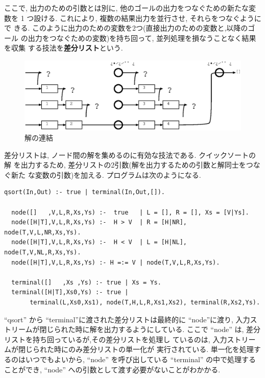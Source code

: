 \documentclass[a4,titlepage]{jsreport}
\let\dg\bf
\begin{document}
ここで, 出力のための引数とは別に,  他のゴールの出力をつなぐための新たな変数を
1 つ設ける.  これにより,  複数の結果出力を並行させ,  それらをつなぐようにで
きる.  このように出力のための変数を2つ(直接出力のための変数と,以降のゴール
の出力をつなぐための変数)を持ち回って,  並列処理を損なうことなく結果を収集
する技法を{\dg 差分リスト}という.  

\begin{figure}[htbp]
  \begin{center}
    \includegraphics[width=.8\textwidth]{fig/dlt6.eps}
    \caption{解の連結}
  \end{center}
\end{figure}

  差分リストは,  ノード間の解を集めるのに有効な技法である.  クイックソートの解
を出力するため,  差分リストの2引数(解を出力するための引数と解同士をつなぐ新た
な変数の引数)を加える.  プログラムは次のようになる.  

\begin{Verbatim}[baselinestretch=0.8]
  qsort(In,Out) :- true | terminal(In,Out,[]).

  node([]   ,V,L,R,Xs,Ys) :-  true   | L = [], R = [], Xs = [V|Ys].
  node([H|T],V,L,R,Xs,Ys) :-  H > V  | R = [H|NR], node(T,V,L,NR,Xs,Ys).
  node([H|T],V,L,R,Xs,Ys) :-  H < V  | L = [H|NL], node(T,V,NL,R,Xs,Ys).
  node([H|T],V,L,R,Xs,Ys) :- H =:= V | node(T,V,L,R,Xs,Ys).

  terminal([]   ,Xs ,Ys) :- true | Xs = Ys.
  terminal([H|T],Xs0,Ys) :- true |
       terminal(L,Xs0,Xs1), node(T,H,L,R,Xs1,Xs2), terminal(R,Xs2,Ys).
\end{Verbatim}

  ``qsort'' から ``terminal''に渡された差分リストは最終的に ``node''に渡り,
入力ストリームが閉じられた時に解を出力するようにしている.
  ここで ``node'' は,  差分リストを持ち回っているが,その差分リストを処理し
ているのは, 入力ストリームが閉じられた時にのみ差分リストの単一化が
実行されている.  
  単一化を処理するのはいつでもよいから,  ``node'' を呼び出している ``terminal''
 の中で処理することができ,  
``node'' への引数として渡す必要がないことがわかかる.  
\end{document}
